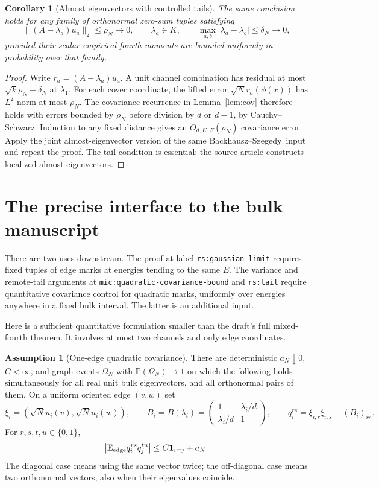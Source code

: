 \documentclass[11pt]{article}
\numberwithin{equation}{section}
\newtheorem{corollary}[theorem]{Corollary}
\theoremstyle{definition}
\newtheorem{assumption}[theorem]{Assumption}
\theoremstyle{remark}
\newcommand{\E}{\mathbb E}
\newcommand{\PP}{\mathbb P}
\newcommand{\one}{\mathbf 1}
\newcommand{\BS}{Backhausz--Szegedy}
\begin{document}
\begin{corollary}[Almost eigenvectors with controlled tails]\label{cor:almost}
The same conclusion holds for any family of orthonormal zero-sum
tuples satisfying
\[
 \|(A-\lambda_a)u_a\|_2\leq\rho_N\to0,\qquad
 \lambda_a\in K,\qquad
 \max_{a,b}|\lambda_a-\lambda_b|\leq\delta_N\to0,
\]
provided their scalar empirical fourth moments are bounded uniformly
in probability over that family.
\end{corollary}
\begin{proof}
Write $r_a=(A-\lambda_a)u_a$. A unit channel combination has residual
at most $\sqrt k\rho_N+\delta_N$ at $\lambda_1$.
For each cover coordinate, the lifted error $\sqrt N r_a(\phi(x))$
has $L^2$ norm at most $\rho_N$. The covariance recurrence in
Lemma~\ref{lem:cov} therefore holds with errors bounded by $\rho_N$
before division by $d$ or $d-1$, by Cauchy--Schwarz. Induction to any
fixed distance gives an $O_{d,K,F}(\rho_N)$ covariance error.
Apply the joint almost-eigenvector version of the same \BS\ input
and repeat the proof. The tail condition is essential: the source
article constructs localized almost eigenvectors.
\end{proof}

\section{The precise interface to the bulk manuscript}\label{sec:interface}
There are two uses downstream. The proof at label
\texttt{rs:gaussian-limit} requires fixed tuples of edge marks at energies
tending to the same $E$. The variance and remote-tail arguments at
\texttt{mic:quadratic-covariance-bound} and \texttt{rs:tail} require
quantitative covariance control for quadratic marks, uniformly over
energies anywhere in a fixed bulk interval. The latter is an additional
input.

Here is a sufficient quantitative formulation smaller than the draft's
full mixed-fourth theorem. It involves at most two channels and only
edge coordinates.

\begin{assumption}[One-edge quadratic covariance]\label{ass:Q}
There are deterministic $a_N\downarrow0$, $C<\infty$, and graph events
$\Omega_N$ with $\PP(\Omega_N)\to1$ on which the following holds
simultaneously for all real unit bulk eigenvectors, and all orthonormal
pairs of them. On a uniform oriented edge $(v,w)$ set
\[
 \xi_i=(\sqrt N u_i(v),\sqrt N u_i(w)),\qquad
 B_i=B(\lambda_i)=
 \begin{pmatrix}1&\lambda_i/d\\\lambda_i/d&1\end{pmatrix},\qquad
 q_i^{rs}=\xi_{i,r}\xi_{i,s}-(B_i)_{rs}.
\]
For $r,s,t,u\in\{0,1\}$,
\begin{equation}\label{eq:Q}
 \left|\E_{\rm edge}q_i^{rs}q_j^{tu}\right|
 \leq C\one_{i=j}+a_N.
\end{equation}
The diagonal case means using the same vector twice; the off-diagonal
case means two orthonormal vectors, also when their eigenvalues coincide.
\end{assumption}
\end{document}
